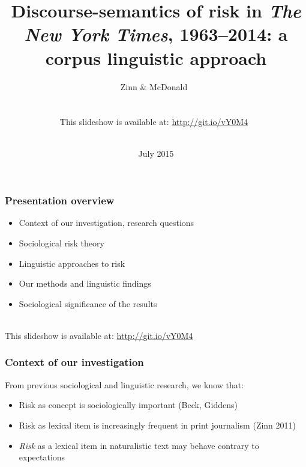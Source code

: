 \documentclass{beamer}       %
\title[ISFC Aachen 2015]{Discourse-semantics of risk in \emph{The New York Times}, 1963--2014: a corpus linguistic approach}
\author[Jens Zinn \and Daniel McDonald]{Zinn \& McDonald~\\~\\~\\This slideshow is available at: \url{http://git.io/vY0M4}~\\~\\}
\date{July 2015}
\begin{document}

\frame{\titlepage}


\begin{frame}
    \frametitle{Presentation overview}
    
    \begin{itemize}
    \item Context of our investigation, research questions
    \item Sociological risk theory
    \item Linguistic approaches to risk
    \item Our methods and linguistic findings
    \item Sociological significance of the results
    \end{itemize}

    ~\\ This slideshow is available at: \url{http://git.io/vY0M4}

\end{frame}


\begin{frame}
    \frametitle{Context of our investigation}
    
    From previous sociological and linguistic research, we know that:

    \begin{itemize}
    \item Risk as concept is sociologically important (Beck, Giddens)
    \item Risk as lexical item is increasingly frequent in print journalism (Zinn 2011)
    \item \emph{Risk} as a lexical item in naturalistic text may behave contrary to expectations \cite{hamilton_meanings_2007}
    \end{itemize}
\end{frame}
\end{document}
